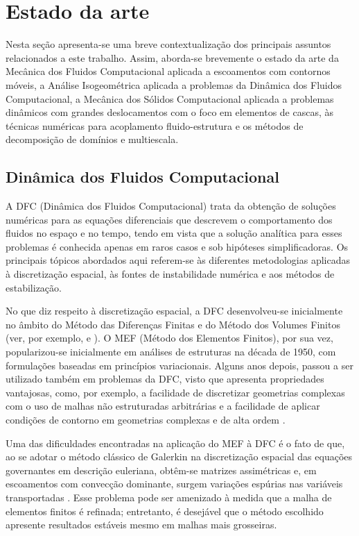 \section[Estado da Arte]{Estado da arte}\label{section:estado_da_arte}

Nesta seção apresenta-se uma breve contextualização dos principais assuntos relacionados a este trabalho. Assim, aborda-se brevemente o estado da arte da Mecânica dos Fluidos Computacional aplicada a escoamentos com contornos móveis, a Análise Isogeométrica aplicada a problemas da Dinâmica dos Fluidos Computacional, a Mecânica dos Sólidos Computacional aplicada a problemas dinâmicos com grandes deslocamentos com o foco em elementos de cascas, às técnicas numéricas para acoplamento fluido-estrutura e os métodos de decomposição de domínios e multiescala. 

\subsection{Dinâmica dos Fluidos Computacional}
\label{cfd}

A DFC (Dinâmica dos Fluidos Computacional) trata da obtenção de soluções numéricas para as  equações diferenciais que descrevem o comportamento dos fluidos no espaço e no tempo, tendo em vista que a solução analítica para esses problemas é conhecida apenas em raros casos e sob hipóteses simplificadoras. Os principais tópicos abordados aqui referem-se às diferentes metodologias aplicadas à discretização espacial, às fontes de instabilidade numérica e aos métodos de estabilização.

No que diz respeito à discretização espacial, a DFC desenvolveu-se inicialmente no âmbito do Método das Diferenças Finitas e do Método dos Volumes Finitos (ver, por exemplo,  e ). O MEF (Método dos Elementos Finitos), por sua vez, popularizou-se inicialmente em análises de estruturas na década de 1950, com formulações baseadas em princípios variacionais. Alguns anos depois, passou a ser utilizado também em problemas da DFC, visto que apresenta propriedades vantajosas, como, por exemplo, a facilidade de discretizar geometrias complexas com o uso de malhas não estruturadas arbitrárias e a facilidade de aplicar condições de contorno em geometrias complexas e de alta ordem \cite{ReddyG:2000,ZienkiewiczTZ:2013}.

Uma das dificuldades encontradas na aplicação do MEF à DFC é o fato de que, ao se adotar o método clássico de Galerkin na discretização espacial das equações governantes em descrição euleriana, obtêm-se matrizes assimétricas e, em escoamentos com convecção dominante, surgem variações espúrias nas variáveis transportadas \cite{BrooksH:1982,ZienkiewiczTN:2014}. Esse problema pode ser amenizado à medida que a malha de elementos finitos é refinada; entretanto, é desejável que o método escolhido apresente resultados estáveis mesmo em malhas mais grosseiras.

